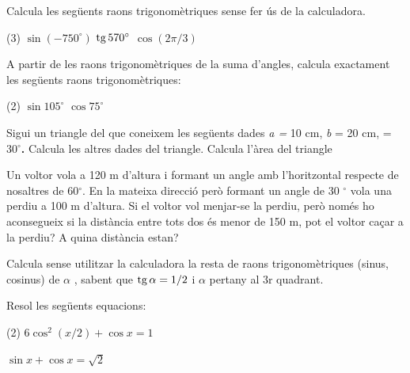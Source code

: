  
\newpage
\begin{autoaval}{50}

\begin{mylist}

\exer[2]
  Calcula les següents raons trigonomètriques sense fer ús de la
  calculadora.
  \begin{tasks}(3)
    \task $\sin (-750^\circ)$
    \task $\mathrm{tg}\, 570^\circ$ 
    \task $\cos (2\pi/3)$
  \end{tasks}
\answers[cols=1]{[$\sin(-750^\circ)=1/2$, $\tg 570^\circ=\frac{-1}{\sqrt 3}=-\frac{\sqrt 3}{3}$,  $\cos 20\pi/3 = -1/2$]}


\exer[2]
  A partir de les raons trigonomètriques de la suma d'angles, calcula exactament les següents
  raons trigonomètriques:

  \begin{tasks}(2)
 	\task $\sin 105^\circ$
    \task $\cos 75^\circ$
  \end{tasks}

\exer[2]
  Sigui un triangle del que coneixem les següents dades \emph{a =} 10
  cm, \emph{b} = 20 cm, = 30${}^\circ$\textbf{.} Calcula les altres dades del
  triangle. Calcula l'àrea del triangle

\exer[2]
  Un voltor vola a 120 m d'altura i formant un angle amb l'horitzontal
  respecte de nosaltres de 60${}^\circ$. En la mateixa direcció
  però formant un angle de 30 ${}^\circ$ vola una perdiu a 100
  m d'altura. Si el voltor vol menjar-se la perdiu, però només ho
  aconsegueix si la distància entre tots dos és menor de 150 m, pot el
  voltor caçar a la perdiu? A quina distància estan?

\exer[2]
  Calcula sense utilitzar la calculadora la resta de raons
  trigonomètriques (sinus, cosinus) de $\alpha$ , sabent que  $\mathrm{tg}\, \alpha = 1/2$ i
  $\alpha$ pertany al 3r quadrant.

\exer[2]
  Resol les següents equacions: 
  \begin{tasks}(2)
  \task $6 \cos^2 (x/2) + \cos x=1$
  
  \task $\sin x + \cos x = \sqrt{2}$
  \end{tasks}


\end{mylist}
\end{autoaval}
